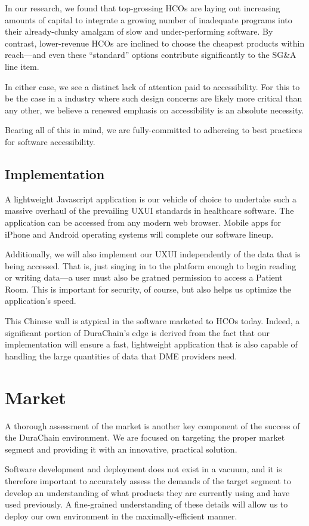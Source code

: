 \documentclass[letterpaper]{article}
\begin{document}
In our research, we found that top-grossing HCOs are laying out increasing amounts of capital to integrate a growing number of inadequate programs into their already-clunky amalgam of slow and under-performing software. By contrast, lower-revenue HCOs are inclined to choose the cheapest products within reach---and even these ``standard'' options contribute significantly to the SG\&A line item.%

In either case, we see a distinct lack of attention paid to accessibility. For this to be the case in a industry where such design concerns are likely more critical than any other, we believe a renewed emphasis on accessibility is an absolute necessity.%

Bearing all of this in mind, we are fully-committed to adhereing to best practices for software accessibility.%

\subsection{Implementation}
A lightweight Javascript application is our vehicle of choice to undertake such a massive overhaul of the prevailing UXUI standards in healthcare software. The application can be accessed from any modern web browser. Mobile apps for iPhone and Android operating systems will complete our software lineup.%

Additionally, we will also implement our UXUI independently of the data that is being accessed. That is, just singing in to the platform enough to begin reading or writing data---a user must also be gratned permission to access a Patient Room. This is important for security, of course, but also helps us optimize the application's speed.%

This Chinese wall is atypical in the software marketed to HCOs today. Indeed, a significant portion of DuraChain's edge is derived from the fact that our implementation will ensure a fast, lightweight application that is also capable of handling the large quantities of data that DME providers need.%

\section{Market}
A thorough assessment of the market is another key component of the success of the DuraChain environment. We are focused on targeting the proper market segment and providing it with an innovative, practical solution.%

Software development and deployment does not exist in a vacuum, and it is therefore important to accurately assess the demands of the target segment to develop an understanding of what products they are currently using and have used previously. A fine-grained understanding of these details will allow us to deploy our own environment in the maximally-efficient manner.%
\end{document}
